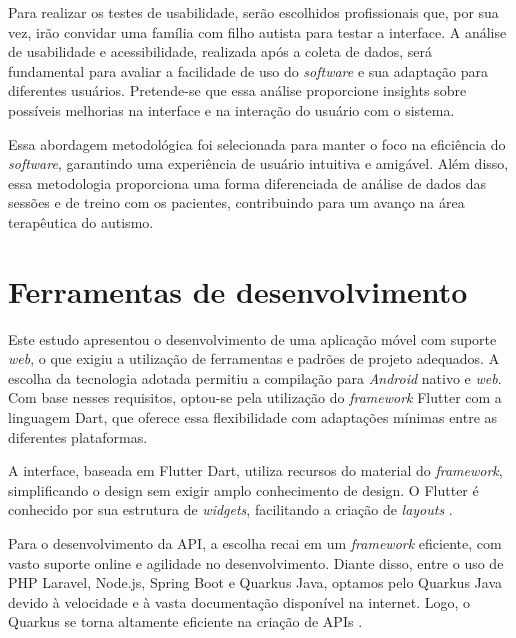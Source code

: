 Para realizar os testes de usabilidade, serão escolhidos profissionais que, por sua vez, 
irão convidar uma família com filho autista para testar a interface. 
A análise de usabilidade e acessibilidade, realizada após a coleta de dados, 
será fundamental para avaliar a facilidade de uso do \textit{software} e sua adaptação para diferentes usuários. 
Pretende-se que essa análise proporcione insights sobre possíveis melhorias na interface e na interação 
do usuário com o sistema.


Essa abordagem metodológica foi selecionada para manter o foco na eficiência do 
\textit{software}, garantindo uma experiência de usuário intuitiva e amigável. 
Além disso, essa metodologia proporciona uma forma diferenciada de análise de dados das sessões e de treino com os pacientes, 
contribuindo para um avanço na área terapêutica do autismo.



\section{Ferramentas de desenvolvimento}
Este estudo apresentou o desenvolvimento de uma aplicação móvel com suporte \textit{web}, 
o que exigiu a utilização de ferramentas e padrões de projeto adequados. 
A escolha da tecnologia adotada permitiu a compilação para \textit{Android} nativo e \textit{web}. 
Com base nesses requisitos, optou-se pela utilização do \textit{framework} Flutter com a linguagem Dart, 
que oferece essa flexibilidade com adaptações mínimas entre as diferentes plataformas.

A interface, baseada em Flutter Dart, utiliza recursos do material do \textit{framework}, 
simplificando o design sem exigir amplo conhecimento de design. 
O Flutter é conhecido por sua estrutura de \textit{widgets}, 
facilitando a criação de \textit{layouts} \cite{windmill2020flutter}.

Para o desenvolvimento da API, a escolha recai em um \textit{framework} eficiente, 
com vasto suporte online e agilidade no desenvolvimento. 
Diante disso, entre o uso de PHP Laravel, Node.js, Spring Boot e Quarkus Java, 
optamos pelo Quarkus Java devido à velocidade e à vasta documentação disponível na internet. 
Logo, o Quarkus se torna altamente eficiente na criação de APIs \cite{koleoso2020welcome}.

